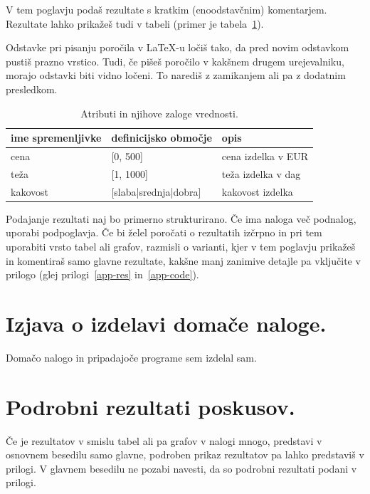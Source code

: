 \documentclass[a4paper,11pt]{article}
\begin{document}

V tem poglavju podaš rezultate s kratkim (enoodstavčnim)
komentarjem. Rezultate lahko prikažeš tudi v tabeli (primer je
tabela~\ref{tab1}).

Odstavke pri pisanju poročila v LaTeX-u ločiš tako, da pred novim
odstavkom pustiš prazno vrstico. Tudi, če pišeš poročilo v kakšnem
drugem urejevalniku, morajo odstavki biti vidno ločeni. To narediš z
zamikanjem ali pa z dodatnim presledkom.

\begin{table}[htbp]
\caption{Atributi in njihove zaloge vrednosti.}
\label{tab1}
\begin{center}
\begin{tabular}{llp{3cm}}
\hline
ime spremenljivke & definicijsko območje & opis \\
\hline
cena & [0, 500] & cena izdelka v EUR\\
teža & [1, 1000] & teža izdelka v dag \\
kakovost & [slaba|srednja|dobra] & kakovost izdelka \\
\hline
\end{tabular}
\end{center}
\end{table}

Podajanje rezultati naj bo primerno strukturirano. Če ima naloga več
podnalog, uporabi podpoglavja. Če bi želel poročati o rezultatih
izčrpno in pri tem uporabiti vrsto tabel ali grafov, razmisli o
varianti, kjer v tem poglavju prikažeš in komentiraš samo glavne
rezultate, kakšne manj zanimive detajle pa vključite v prilogo (glej
prilogi~\ref{app-res} in~\ref{app-code}).

\section{Izjava o izdelavi domače naloge.}
Domačo nalogo in pripadajoče programe sem izdelal sam.

\appendix
\appendixpage
\section{\label{app-res}Podrobni rezultati poskusov.}

Če je rezultatov v smislu tabel ali pa grafov v nalogi mnogo,
predstavi v osnovnem besedilu samo glavne, podroben prikaz
rezultatov pa lahko predstaviš v prilogi. V glavnem besedilu ne
pozabi navesti, da so podrobni rezultati podani v prilogi.
\end{document}
